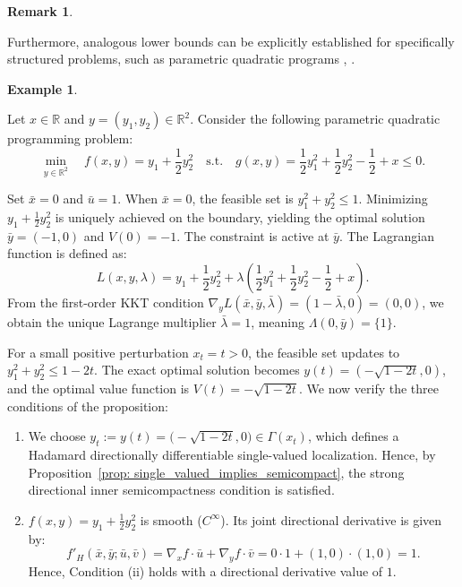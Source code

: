 \documentclass[12pt,twoside,reqno]{amsart}
\theoremstyle{definition}
\newtheorem{example}[theorem]{Example}
\newtheorem{remark}[theorem]{Remark}
\numberwithin{equation}{section}
\begin{document}
\begin{remark}
\begin{itemize}
\end{itemize}

Furthermore, analogous lower bounds can be explicitly established for specifically structured problems, such as parametric quadratic programs \cite[Theorem 4.1]{Tam2001directional}, \cite[Theorem 4]{Dong2024directional}.
\end{remark}


\begin{example}\label{ex: V_flatness_verification}

Let $x \in \mathbb{R}$ and $y = (y_1, y_2) \in \mathbb{R}^2$. Consider the following parametric quadratic programming problem:
\begin{equation*}
    \min_{y \in \mathbb{R}^2} \quad f(x, y) = y_1 + \frac{1}{2}y_2^2 \quad \text{s.t.} \quad g(x, y) = \frac{1}{2}y_1^2 + \frac{1}{2}y_2^2 - \frac{1}{2} + x \le 0.
\end{equation*}

Set $\bar{x} = 0$ and $\bar{u} = 1$.  
When $\bar{x} = 0$, the feasible set is $y_1^2 + y_2^2 \le 1$. Minimizing $y_1 + \frac{1}{2}y_2^2$ is uniquely achieved on the boundary, yielding the optimal solution $\bar{y} = (-1, 0)$ and $V(0) = -1$.
The constraint is active at $\bar{y}$. The Lagrangian function is defined as:
\begin{equation*}
    L(x, y, \lambda) = y_1 + \frac{1}{2}y_2^2 + \lambda \left(\frac{1}{2}y_1^2 + \frac{1}{2}y_2^2 - \frac{1}{2} + x\right).
\end{equation*}
From the first-order KKT condition $\nabla_y L(\bar{x}, \bar{y}, \bar{\lambda}) = (1 - \bar{\lambda}, 0) = (0, 0)$, we obtain the unique Lagrange multiplier $\bar{\lambda} = 1$, meaning $\Lambda(0, \bar{y}) = \{1\}$.

For a small positive perturbation $x_t = t > 0$, the feasible set updates to $y_1^2 + y_2^2 \le 1 - 2t$. The exact optimal solution becomes $y(t) = (-\sqrt{1-2t}, 0)$, and the optimal value function is $V(t) = -\sqrt{1-2t}$. We now verify the three conditions of the proposition:

\begin{enumerate}
    \item[\rm (i)] 
We choose $y_t := y(t) = \bigl(-\sqrt{1-2t},0\bigr) \in \Gamma(x_t)$, which defines a Hadamard directionally differentiable single-valued localization. Hence, by Proposition~\ref{prop: single_valued_implies_semicompact}, the strong directional inner semicompactness condition is satisfied.

    \item[\rm (ii)] 
    $f(x, y) = y_1 + \frac{1}{2}y_2^2$ is smooth ($C^\infty$). Its joint directional derivative is given by:
    \begin{equation*}
        f'_H(\bar{x}, \bar{y}; \bar{u}, \bar{v}) = \nabla_x f \cdot \bar{u} + \nabla_y f \cdot \bar{v} = 0 \cdot 1 + (1, 0) \cdot (1, 0) = 1.
    \end{equation*}
    Hence, Condition (ii) holds with a directional derivative value of $1$.


\end{enumerate}
\end{example}
\end{document}
